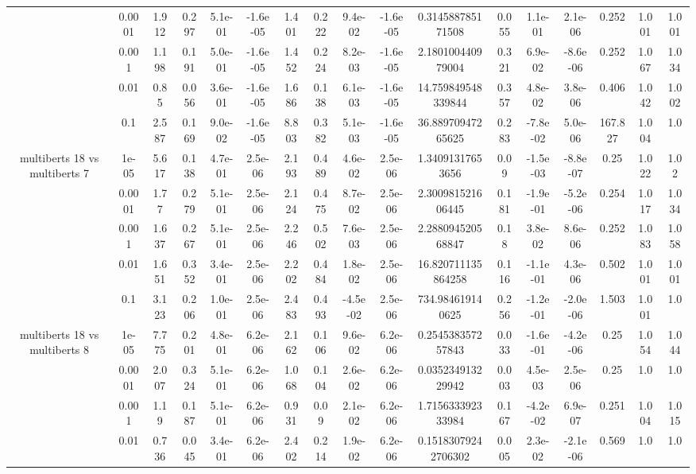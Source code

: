 \begin{tabular}{|c|c|c|c|c|c|c|c|c|c|c|c|c|c|c|c|c|}
 & 0.0001 & 1.912 & 0.297 & 5.1e-01 & -1.6e-05 & 1.401 & 0.222 & 9.4e-02 & -1.6e-05 & 0.314588785171508 & 0.055 & 1.1e-01 & 2.1e-06 & 0.252 & 1.001 & 1.001 \\
 & 0.001 & 1.198 & 0.191 & 5.0e-01 & -1.6e-05 & 1.452 & 0.224 & 8.2e-03 & -1.6e-05 & 2.180100440979004 & 0.321 & 6.9e-02 & -8.6e-06 & 0.252 & 1.067 & 1.034 \\
 & 0.01 & 0.85 & 0.056 & 3.6e-01 & -1.6e-05 & 1.686 & 0.138 & 6.1e-03 & -1.6e-05 & 14.759849548339844 & 0.357 & 4.8e-02 & 3.8e-06 & 0.406 & 1.042 & 1.002 \\
 & 0.1 & 2.587 & 0.169 & 9.0e-02 & -1.6e-05 & 8.803 & 0.382 & 5.1e-03 & -1.6e-05 & 36.88970947265625 & 0.283 & -7.8e-02 & 5.0e-06 & 167.827 & 1.004 & 1.0 \\
\hline
\multirow{5}{*}{multiberts 18 vs multiberts 7} & 1e-05 & 5.617 & 0.138 & 4.7e-01 & 2.5e-06 & 2.193 & 0.489 & 4.6e-02 & 2.5e-06 & 1.34091317653656 & 0.09 & -1.5e-03 & -8.8e-07 & 0.25 & 1.022 & 1.02 \\
 & 0.0001 & 1.77 & 0.279 & 5.1e-01 & 2.5e-06 & 2.124 & 0.475 & 8.7e-02 & 2.5e-06 & 2.300981521606445 & 0.181 & -1.9e-01 & -5.2e-06 & 0.254 & 1.017 & 1.034 \\
 & 0.001 & 1.637 & 0.267 & 5.1e-01 & 2.5e-06 & 2.246 & 0.502 & 7.6e-03 & 2.5e-06 & 2.288094520568847 & 0.18 & 3.8e-02 & 8.6e-06 & 0.252 & 1.083 & 1.058 \\
 & 0.01 & 1.651 & 0.352 & 3.4e-01 & 2.5e-06 & 2.202 & 0.484 & 1.8e-02 & 2.5e-06 & 16.820711135864258 & 0.116 & -1.1e-01 & 4.3e-06 & 0.502 & 1.001 & 1.001 \\
 & 0.1 & 3.123 & 0.206 & 1.0e-01 & 2.5e-06 & 2.483 & 0.493 & -4.5e-02 & 2.5e-06 & 734.984619140625 & 0.256 & -1.2e-01 & -2.0e-06 & 1.503 & 1.001 & 1.0 \\
\hline
\multirow{5}{*}{multiberts 18 vs multiberts 8} & 1e-05 & 7.775 & 0.201 & 4.8e-01 & 6.2e-06 & 2.162 & 0.106 & 9.6e-02 & 6.2e-06 & 0.254538357257843 & 0.033 & -1.6e-01 & -4.2e-06 & 0.25 & 1.054 & 1.044 \\
 & 0.0001 & 2.007 & 0.324 & 5.1e-01 & 6.2e-06 & 1.068 & 0.104 & 2.6e-02 & 6.2e-06 & 0.035234913229942 & 0.003 & 4.5e-03 & 2.5e-06 & 0.25 & 1.0 & 1.0 \\
 & 0.001 & 1.19 & 0.187 & 5.1e-01 & 6.2e-06 & 0.931 & 0.09 & 2.1e-02 & 6.2e-06 & 1.715633392333984 & 0.167 & -4.2e-02 & 6.9e-07 & 0.251 & 1.004 & 1.015 \\
 & 0.01 & 0.736 & 0.045 & 3.4e-01 & 6.2e-06 & 2.402 & 0.214 & 1.9e-02 & 6.2e-06 & 0.15183079242706302 & 0.005 & 2.3e-02 & -2.1e-06 & 0.569 & 1.0 & 1.0 \\

\end{tabular}
